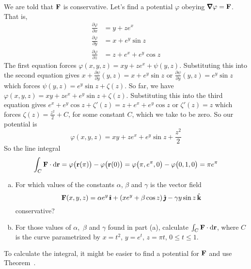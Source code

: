 \begin{solution} 
We are told that $\mathbf{F}$ is conservative. Let's find a potential
$\varphi$ obeying $\vnabla\varphi = \vF$. That is,
\begin{align*}
\frac{\partial\varphi}{\partial x}
   &= y + ze^x \\
\frac{\partial\varphi}{\partial y}
   &= x + e^y \sin z \\
\frac{\partial\varphi}{\partial z}
   &= z + e^x + e^y \cos z 
\end{align*}
The first equation forces $\varphi(x,y,z) = xy +ze^x +\psi(y,z)$.
Substituting this into the second equation gives
$x+\frac{\partial\psi}{\partial y}(y,z) = x + e^y \sin z$ 
or $\frac{\partial\psi}{\partial y}(y,z) = e^y \sin z$
which forces $\psi(y,z) = e^y\sin z +\zeta(z)$. So far, we have
$\varphi(x,y,z) = xy +ze^x +e^y\sin z +\zeta(z)$.
Substituting this into the third equation gives
$e^x +e^y\cos z +\zeta'(z) = z + e^x + e^y \cos z$ or 
$\zeta'(z) = z$ which forces $\zeta(z) = \frac{z^2}{2}+C$, for some constant
$C$, which we take to be zero. So our potential is
\begin{equation*}
\varphi(x,y,z) = xy +ze^x +e^y\sin z +\frac{z^2}{2}
\end{equation*}
So the line integral
\begin{equation*}
\int_C \mathbf{F}\cdot \mathrm{d}\mathbf{r}
=\varphi\big(\mathbf{r}(\pi)\big) -\varphi\big(\mathbf{r}(0)\big)
=\varphi\big(\pi,e^\pi,0\big) -\varphi\big(0,1,0\big)
=\pi e^\pi
\end{equation*}

\end{solution}



\begin{question}[M317 2002A] %
\begin{enumerate}[(a)]
\item  %
For which values of the constants $\alpha$, $\beta$ and $\gamma$
is the vector field
$$
\mathbf{F}(x,y,z) = \alpha e^y\,\hat{\pmb{\imath}}+(xe^y+\beta\cos z)\,\hat{\pmb{\jmath}}-\gamma y\sin z\,\hat{\mathbf{k}}
$$
conservative?
\item %
For those values of $\alpha$,\ $\beta$ and $\gamma$ found in part
(a), calculate $\int_C \mathbf{F}\cdot \mathrm{d}\mathbf{r}$, where $C$ is the curve parametrized
by $x=t^2$, $y=e^t$, $z=\pi t$, $0\le t\le 1$.
\end{enumerate}
\end{question}

\begin{hint} 
To calculate the integral, it might be easier to find a potential for $\mathbf{F}$ and use Theorem~.
\end{hint}

